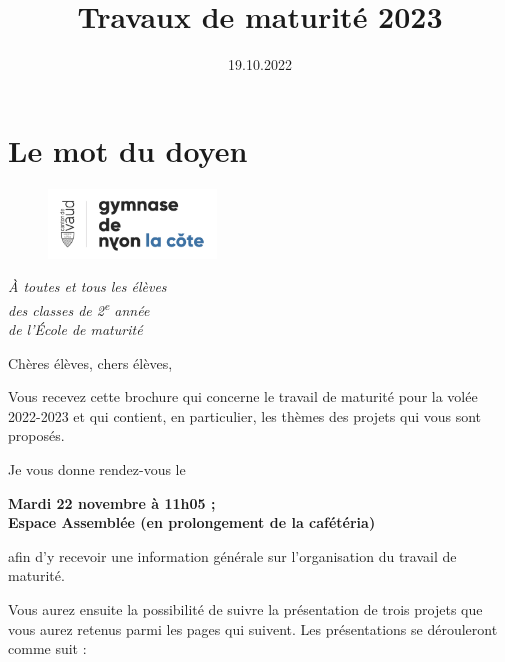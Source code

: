 \documentclass[
  10pt,
  french,
  a5paper,
  openany]{book}
\title{Travaux de maturité 2023}
\author{}
\date{\vspace{-2.5em}19.10.2022}
\newenvironment{signature}{\begin{flushright}}{\end{flushright}}
\newenvironment{centerbold}{\begin{center}\bfseries}{\end{center}}
\begin{document}
\maketitle

{
\setcounter{tocdepth}{0}
\tableofcontents
}
\hypertarget{le-mot-du-doyen}{%
\chapter*{Le mot du doyen}\label{le-mot-du-doyen}}

\begin{figure}

\includegraphics[height=5em]{images/logoGNLC} \hfill{}

\end{figure}


\begin{signature}
\emph{À toutes et tous les élèves}\\
\emph{des classes de 2\textsuperscript{e} année}\\
\emph{de l'École de maturité}

\end{signature}


Chères élèves, chers élèves,

Vous recevez cette brochure qui concerne le travail de maturité pour la volée 2022-2023 et qui contient, en particulier, les thèmes des projets qui vous sont proposés.

Je vous donne rendez-vous le

\begin{centerbold}
Mardi 22 novembre à 11h05 ;\\
Espace Assemblée (en prolongement de la cafétéria)

\end{centerbold}

afin d'y recevoir une information générale sur l'organisation du travail de maturité.

Vous aurez ensuite la possibilité de suivre la présentation de trois projets que vous aurez retenus parmi les pages qui suivent. Les présentations se dérouleront comme suit :
\end{document}
